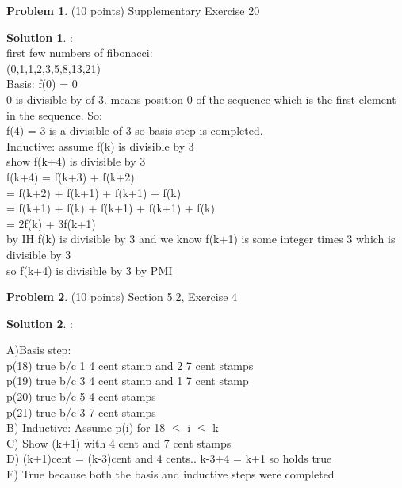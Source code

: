 \documentclass{article}
\theoremstyle{definition}
\newtheorem{problem}{Problem}
\newtheorem*{solution}{Solution}
\begin{document}
\begin{problem} (10 points) Supplementary Exercise 20
\end{problem}
\begin{solution}:
\\
first few numbers of fibonacci:
\\
(0,1,1,2,3,5,8,13,21)
\\
Basis: f(0) = 0
\\
0 is divisible by of 3. means position 0 of the sequence which is the first element in the sequence. So:
\\
f(4) = 3 is a divisible of 3 so basis step is completed.
\\
Inductive: assume f(k) is divisible by 3
\\
show f(k+4) is divisible by 3
\\
f(k+4) = f(k+3) + f(k+2)
\\
= f(k+2) + f(k+1) + f(k+1) + f(k)
\\
= f(k+1) + f(k) + f(k+1) + f(k+1) + f(k)
\\
= 2f(k) + 3f(k+1)
\\
by IH f(k) is divisible by 3 and we know f(k+1) is some integer times 3 which is divisible by 3
\\
so f(k+4) is divisible by 3 by PMI
\end{solution}



\newpage

\begin{problem} (10 points) Section 5.2, Exercise 4
\end{problem}
\begin{solution}:

A)Basis step:
\\
p(18) true b/c 1 4 cent stamp and 2 7 cent stamps
\\
p(19) true b/c 3 4 cent stamp and 1 7 cent stamp
\\
p(20) true b/c 5 4 cent stamps
\\
p(21) true b/c 3 7 cent stamps
\\
B) Inductive:  Assume p(i) for 18 $\leq$ i $\leq$ k
\\
C) Show (k+1) with 4 cent and 7 cent stamps
\\
D) (k+1)cent = (k-3)cent and 4 cents.. k-3+4 = k+1 so holds true
\\
E) True because both the basis and inductive steps were completed

\end{solution}
\end{document}
